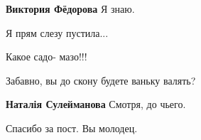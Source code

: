 \begin{itemize}
\begin{itemize}
\textbf{Виктория Фёдорова} Я знаю.
\end{itemize}

 
Я прям слезу пустила...

Какое садо- мазо!!!

Забавно, вы до скону будете ваньку валять?

\begin{itemize}
 
\textbf{Наталія Сулейманова} Смотря, до чьего.
\end{itemize}

 
Спасибо за пост. Вы молодец.
 

\end{itemize}


